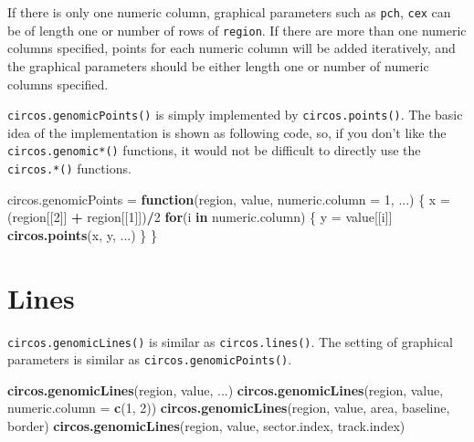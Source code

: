 \documentclass[]{book}
\newenvironment{Shaded}{\begin{snugshade}}{\end{snugshade}}
\newcommand{\KeywordTok}[1]{\textcolor[rgb]{0.13,0.29,0.53}{\textbf{#1}}}
\newcommand{\DataTypeTok}[1]{\textcolor[rgb]{0.13,0.29,0.53}{#1}}
\newcommand{\DecValTok}[1]{\textcolor[rgb]{0.00,0.00,0.81}{#1}}
\newcommand{\StringTok}[1]{\textcolor[rgb]{0.31,0.60,0.02}{#1}}
\newcommand{\ControlFlowTok}[1]{\textcolor[rgb]{0.13,0.29,0.53}{\textbf{#1}}}
\newcommand{\OperatorTok}[1]{\textcolor[rgb]{0.81,0.36,0.00}{\textbf{#1}}}
\newcommand{\NormalTok}[1]{#1}
\begin{document}
If there is only one numeric column, graphical parameters such as
\texttt{pch}, \texttt{cex} can be of length one or number of rows of
\texttt{region}. If there are more than one numeric columns specified,
points for each numeric column will be added iteratively, and the
graphical parameters should be either length one or number of numeric
columns specified.

\texttt{circos.genomicPoints()} is simply implemented by
\texttt{circos.points()}. The basic idea of the implementation is shown
as following code, so, if you don't like the \texttt{circos.genomic*()}
functions, it would not be difficult to directly use the
\texttt{circos.*()} functions.

\begin{Shaded}
\begin{Highlighting}[]
\NormalTok{circos.genomicPoints =}\StringTok{ }\ControlFlowTok{function}\NormalTok{(region, value, }\DataTypeTok{numeric.column =} \DecValTok{1}\NormalTok{, ...) \{}
\NormalTok{    x =}\StringTok{ }\NormalTok{(region[[}\DecValTok{2}\NormalTok{]] }\OperatorTok{+}\StringTok{ }\NormalTok{region[[}\DecValTok{1}\NormalTok{]])}\OperatorTok{/}\DecValTok{2}
    \ControlFlowTok{for}\NormalTok{(i }\ControlFlowTok{in}\NormalTok{ numeric.column) \{}
\NormalTok{        y =}\StringTok{ }\NormalTok{value[[i]]}
        \KeywordTok{circos.points}\NormalTok{(x, y, ...)}
\NormalTok{    \}}
\NormalTok{\}}
\end{Highlighting}
\end{Shaded}

\section{Lines}\label{genomic-lines}

\texttt{circos.genomicLines()} is similar as \texttt{circos.lines()}.
The setting of graphical parameters is similar as
\texttt{circos.genomicPoints()}.

\begin{Shaded}
\begin{Highlighting}[]
\KeywordTok{circos.genomicLines}\NormalTok{(region, value, ...)}
\KeywordTok{circos.genomicLines}\NormalTok{(region, value, }\DataTypeTok{numeric.column =} \KeywordTok{c}\NormalTok{(}\DecValTok{1}\NormalTok{, }\DecValTok{2}\NormalTok{))}
\KeywordTok{circos.genomicLines}\NormalTok{(region, value, area, baseline, border)}
\KeywordTok{circos.genomicLines}\NormalTok{(region, value, sector.index, track.index)}
\end{Highlighting}
\end{Shaded}
\end{document}
